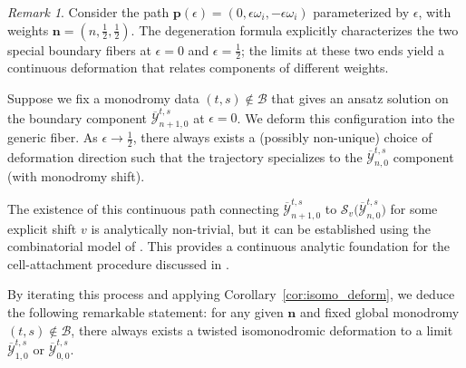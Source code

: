 \documentclass[11pt]{amsart}
\theoremstyle{remark}
\newtheorem{remark}[theorem]{Remark}
\numberwithin{equation}{section}
\begin{document}
\begin{remark}
Consider the path $\mathbf{p}(\epsilon) = (0, \epsilon\omega_i, -\epsilon\omega_i)$ parameterized by $\epsilon$, with weights $\mathbf{n} = (n, \frac{1}{2}, \frac{1}{2})$. The degeneration formula explicitly characterizes the two special boundary fibers at $\epsilon=0$ and $\epsilon=\frac{1}{2}$; the limits at these two ends yield a continuous deformation that relates components of different weights.

\small
\begin{figure}[ht!]
\centering
{}
\end{figure}
\normalsize

Suppose we fix a monodromy data $(t,s)\notin \mathcal{B}$ that gives an ansatz solution on the boundary component $\overline{\mathcal{Y}}_{n+1, 0}^{t,s}$ at $\epsilon=0$. We deform this configuration into the generic fiber. As $\epsilon \to \frac{1}{2}$, there always exists a (possibly non-unique) choice of deformation direction such that the trajectory specializes to the $\overline{\mathcal{Y}}_{n, 0}^{t,s}$ component (with monodromy shift).

The existence of this continuous path connecting $\overline{\mathcal{Y}}_{n+1, 0}^{t,s}$ to $\mathcal{S}_v\Big(\overline{\mathcal{Y}}_{n, 0}^{t,s}\Big)$ for some explicit shift $v$ is analytically non-trivial, but it can be established using the combinatorial model of \cite{Wu_combinatorial}. This provides a continuous analytic foundation for the cell-attachment procedure discussed in \cite{Chou_Wang_Wu, Eremenko_Mondello_Panov_2023}. 

By iterating this process and applying Corollary~\ref{cor:isomo_deform}, we deduce the following remarkable statement: for any given $\mathbf{n}$ and fixed global monodromy $(t,s) \notin \mathcal{B}$, there always exists a twisted isomonodromic deformation to a limit $\overline{\mathcal{Y}}^{t,s}_{1,0}$ or $\overline{\mathcal{Y}}^{t,s}_{0,0}$.
\end{remark}
\end{document}
